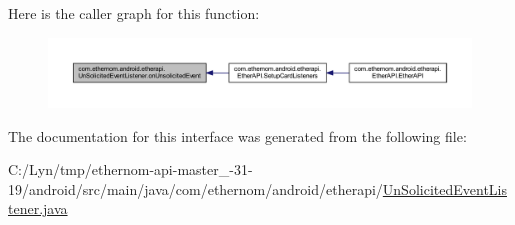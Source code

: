 Here is the caller graph for this function\+:\nopagebreak
\begin{figure}[H]
\begin{center}
\leavevmode
\includegraphics[width=350pt]{interfacecom_1_1ethernom_1_1android_1_1etherapi_1_1_un_solicited_event_listener_aab916d0c4a5c3f72975570d591be758f_icgraph}
\end{center}
\end{figure}


The documentation for this interface was generated from the following file\+:\begin{DoxyCompactItemize}
\item 
C\+:/\+Lyn/tmp/ethernom-\/api-\/master\+\_-\/31-\/19/android/src/main/java/com/ethernom/android/etherapi/\mbox{\hyperlink{_un_solicited_event_listener_8java}{Un\+Solicited\+Event\+Listener.\+java}}\end{DoxyCompactItemize}
